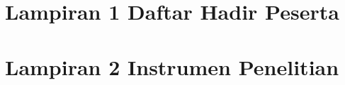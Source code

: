 \newpage
\thispagestyle{empty}

\section*{Lampiran 1 Daftar Hadir Peserta}



\newpage
\thispagestyle{empty}
\section*{Lampiran 2 Instrumen Penelitian}





